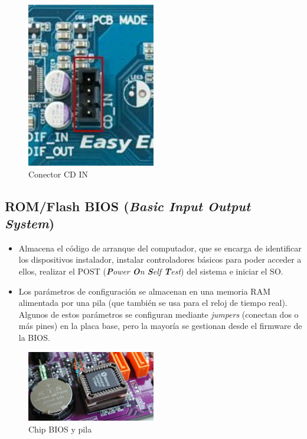 \documentclass[12pt,spanish]{article}
\begin{document}
\begin{figure}[H]
	\centering
	\includegraphics[width=0.5\textwidth]{cdin.jpg}
	\caption{Conector CD IN}
\end{figure}

\subsection{ROM/Flash BIOS (\textit{\textbf{B}asic \textbf{I}nput \textbf{O}utput \textbf{S}ystem})}

\begin{itemize}
	\item Almacena el código de arranque del computador, que se encarga de identificar los dispositivos instalador, instalar controladores básicos para poder acceder a ellos, realizar el POST (\textit{\textbf{P}ower \textbf{O}n \textbf{S}elf \textbf{T}est}) del sistema e iniciar el SO.
	\item Los parámetros de configuración se almacenan en una memoria RAM alimentada por una pila (que también se usa para el reloj de tiempo real). Algunos de estos parámetros se configuran mediante \textit{jumpers} (conectan dos o más pines) en la placa base, pero la mayoría se gestionan desde el firmware de la BIOS.
\end{itemize}

\begin{figure}[H]
	\centering
	\includegraphics[width=0.5\textwidth]{biosbattery.jpg}
	\caption{Chip BIOS y pila}
\end{figure}
\end{document}
